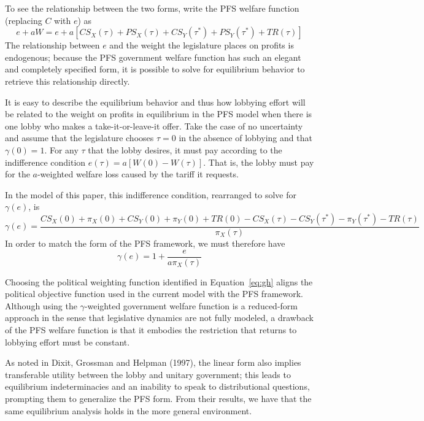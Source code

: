 \documentclass[10pt]{article}
\newcommand{\ga}{\gamma}
\begin{document}
To see the relationship between the two forms, write the PFS welfare function (replacing $C$ with $e$) as
\[
  e + aW = e + a \left[ \mathit{CS}_X(\tau) + \mathit{PS}_X(\tau) + \mathit{CS}_Y(\tau^*) + \mathit{PS}_Y(\tau^*) + \mathit{TR}(\tau) \right]
\]
The relationship between $e$ and the weight the legislature places on profits is endogenous; because the PFS government welfare function has such an elegant and completely specified form, it is possible to solve for equilibrium behavior to retrieve this relationship directly.

It is easy to describe the equilibrium behavior and thus how lobbying effort will be related to the weight on profits in equilibrium in the PFS model when there is one lobby who makes a take-it-or-leave-it offer. Take the case of no uncertainty and assume that the legislature chooses $\tau=0$ in the absence of lobbying and that $\ga(0)=1$. For any $\tau$ that the lobby desires, it must pay according to the  indifference condition $e(\tau) = a \left[ W(0) - W(\tau) \right]$. That is, the lobby must pay for the $a$-weighted welfare loss caused by the tariff it requests.

In the model of this paper, this indifference condition, rearranged to solve for $\ga(e)$, is
		    \[
		      \ga(e) = \frac{\mathit{CS}_X(0) + \pi_X(0) + \mathit{CS}_Y(0) + \pi_Y(0) + \mathit{TR}(0) - \mathit{CS}_X(\tau) - \mathit{CS}_Y(\tau^*) - \pi_Y(\tau^*) - \mathit{TR}(\tau)}{\pi_X(\tau)}
		    \] 
In order to match the form of the PFS framework, we must therefore have
		    \begin{equation}
		      \ga(e) = 1 + \frac{e}{a\pi_X(\tau)}
		      \label{eq:gh}
		    \end{equation}

Choosing the political weighting function identified in Equation~\ref{eq:gh} aligns the political objective function used in the current model with the PFS framework. Although using the $\ga$-weighted government welfare function is a reduced-form approach in the sense that legislative dynamics are not fully modeled, a drawback of the PFS welfare function is that it embodies the restriction that returns to lobbying effort must be constant.

As noted in Dixit, Grossman and Helpman (1997), the linear form also implies transferable utility between the lobby and unitary government; this leads to equilibrium indeterminacies and an inability to speak to distributional questions, prompting them to generalize the PFS form. From their results, we have that the same equilibrium analysis holds in the more general environment.
\end{document}
